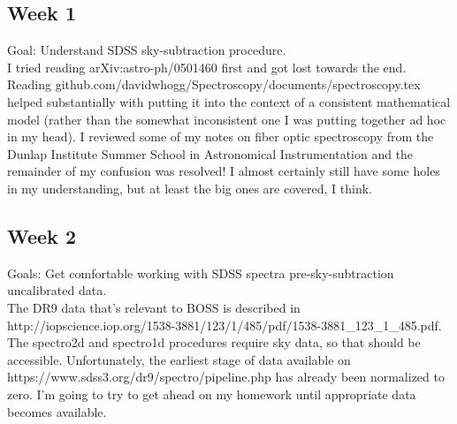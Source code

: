 \documentclass[12pt]{article}
\begin{document}
\subsection*{Week 1}
Goal: Understand SDSS sky-subtraction procedure.\\
\indent I tried reading arXiv:astro-ph/0501460 first and got lost towards the end.  Reading github.com/davidwhogg/Spectroscopy/documents/spectroscopy.tex helped substantially with putting it into the context of a consistent mathematical model (rather than the somewhat inconsistent one I was putting together ad hoc in my head).  I reviewed some of my notes on fiber optic spectroscopy from the Dunlap Institute Summer School in Astronomical Instrumentation and the remainder of my confusion was resolved!  I almost certainly still have some holes in my understanding, but at least the big ones are covered, I think.
\subsection*{Week 2}
Goals: Get comfortable working with SDSS spectra pre-sky-subtraction uncalibrated data.\\
\indent The DR9 data that's relevant to BOSS is described in http://iopscience.iop.org/1538-3881/123/1/485/pdf/1538-3881\_123\_1\_485.pdf.  The spectro2d and spectro1d procedures require sky data, so that should be accessible.  Unfortunately, the earliest stage of data available on https://www.sdss3.org/dr9/spectro/pipeline.php has already been normalized to zero.  I'm going to try to get ahead on my homework until appropriate data becomes available.
\end{document}
